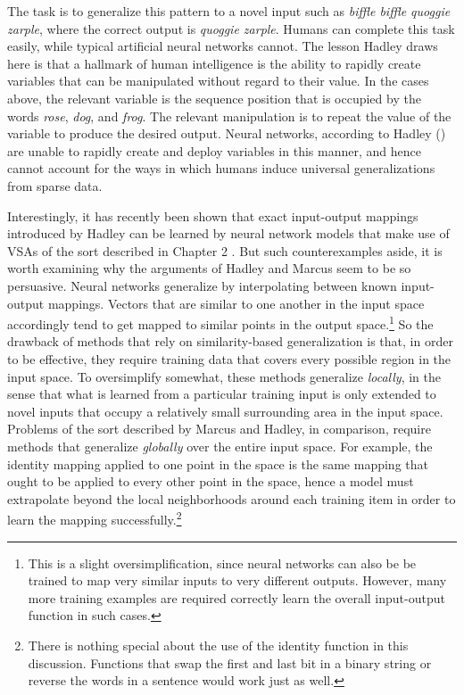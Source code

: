 \noindent
The task is to generalize this pattern to a novel input such as \textit{biffle biffle quoggie zarple}, where the correct output is \textit{quoggie zarple}. Humans can complete this task easily, while typical artificial neural networks cannot. The lesson Hadley draws here is that a hallmark of human intelligence is the ability to rapidly create variables that can be manipulated without regard to their value. In the cases above, the relevant variable is the sequence position that is occupied by the words \textit{rose}, \textit{dog}, and \textit{frog}. The relevant manipulation is to repeat the value of the variable to produce the desired output. Neural networks, according to Hadley (\citeyear{Hadley:2009}) are unable to rapidly create and deploy variables in this manner, and hence cannot account for the ways in which humans induce universal generalizations from sparse data.

Interestingly, it has recently been shown that exact input-output mappings introduced by Hadley can be learned by neural network models that make use of VSAs of the sort described in Chapter 2 \citep[][pp. 269-72]{Eliasmith:2013}. But such counterexamples aside, it is worth examining why the arguments of Hadley and Marcus seem to be so persuasive. Neural networks generalize by interpolating between known input-output mappings. Vectors that are similar to one another in the input space accordingly tend to get mapped to similar points in the output space.\footnote{This is a slight oversimplification, since neural networks can also be be trained to map very similar inputs to very different outputs. However, many more training examples are required correctly learn the overall input-output function in such cases.} So the drawback of methods that rely on similarity-based generalization is that, in order to be effective, they require training data that covers every possible region in the input space. To oversimplify somewhat, these methods generalize \textit{locally}, in the sense that what is learned from a particular training input is only extended to novel inputs that occupy a relatively small surrounding area in the input space. Problems of the sort described by Marcus and Hadley, in comparison, require methods that generalize \textit{globally} over the entire input space. For example, the identity mapping applied to one point in the space is the same mapping that ought to be applied to every other point in the space, hence a model must extrapolate beyond the local neighborhoods around each training item in order to learn the mapping successfully.\footnote{There is nothing special about the use of the identity function in this discussion. Functions that swap the first and last bit in a binary string or reverse the words in a sentence would work just as well.}

